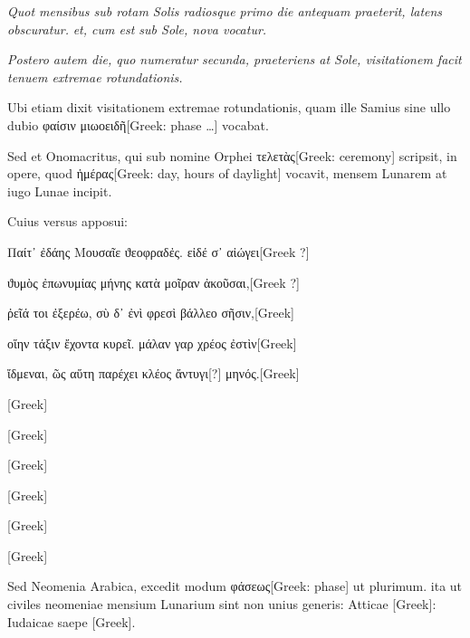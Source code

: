 \textit{Quot mensibus sub rotam Solis radiosque primo die
antequam praeterit, latens obscuratur.}
 \textit{et, cum est sub Sole, nova vocatur.}

\textit{Postero autem die, quo numeratur secunda,
 praeteriens at Sole, visitationem
facit tenuem extremae rotundationis.}

Ubi etiam dixit visitationem
extremae rotundationis, quam ille Samius sine ullo dubio
 \textgreek{φαίσιν μιωοειδῆ[Greek: phase …]} vocabat.

Sed et Onomacritus, qui sub nomine Orphei \textgreek{τελετὰς[Greek: ceremony]}
scripsit, in opere, quod
 \textgreek{ἡμέρας[Greek: day, hours of daylight]}
 vocavit, mensem Lunarem at iugo Lunae
incipit.

Cuius versus apposui:

\begin{greek}
Παίτ᾽ ἐδάης Μουσαῖε ϑεοφραδἐς. εἰδέ σ᾽ αἰώγει[Greek ?]

ϑυμὸς ἐπωνυμίας μήνης κατὰ μοῖραν ἀκοῦσαι,[Greek ?]

ῤεῖά τοι ἐξερέω, σὺ δ᾽ ἐνὶ φρεσὶ βάλλεο σῆσιν,[Greek]

οἵην τάξιν ἔχοντα κυρεῖ. μάλαν γαρ χρέος ἐστὶν[Greek]

ἴδμεναι, ῶς αὕτη παρέχει κλέος ἄντυγι[?] μηνός.[Greek]

\textgreek{[Greek]}

\textgreek{[Greek]}

\textgreek{[Greek]}

\textgreek{[Greek]}

\textgreek{[Greek]}

\textgreek{[Greek]}
\end{greek}

Sed Neomenia Arabica, excedit modum
 \textgreek{φάσεως[Greek: phase]} ut plurimum. ita ut
civiles neomeniae mensium Lunarium sint non unius generis: Atticae
\textgreek{[Greek]}: Iudaicae saepe \textgreek{[Greek]}.

